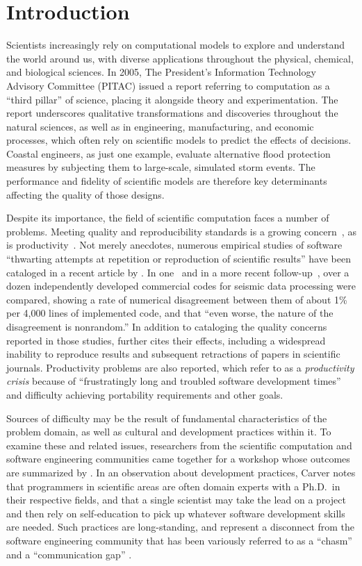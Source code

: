\documentclass[11pt]{article}
\begin{document}
\section{Introduction}

Scientists increasingly rely on computational models to explore and
understand the world around us, with diverse applications throughout
the physical, chemical, and biological sciences.  In 2005, The
President's Information Technology Advisory Committee (PITAC) issued a
report referring to computation as a ``third pillar'' of science,
placing it alongside theory and experimentation.  The report
underscores qualitative transformations and discoveries throughout the
natural sciences, as well as in engineering, manufacturing, and
economic processes, which often rely on scientific models to predict
the effects of decisions.  Coastal engineers, as just one example,
evaluate alternative flood protection measures by subjecting them to
large-scale, simulated storm events.  The performance and fidelity of
scientific models are therefore key determinants affecting the quality
of those designs.

Despite its importance, the field of scientific computation faces a
number of problems.  Meeting quality and reproducibility standards is
a growing concern~\citep{wilson2006}, as is
productivity~\citep{faulk2009}.  Not merely anecdotes, numerous
empirical studies of software ``thwarting attempts at repetition or
reproduction of scientific results'' have been cataloged in a recent
article by \cite{storer2017}.  In one~\citep{hatton1994} and in a more
recent follow-up~\citep{hatton2007}, over a dozen independently
developed commercial codes for seismic data processing were compared,
showing a rate of numerical disagreement between them of about 1\% per
4,000 lines of implemented code, and that ``even worse, the nature of
the disagreement is nonrandom.''  In addition to cataloging the
quality concerns reported in those studies, \cite{storer2017} further
cites their effects, including a widespread inability to reproduce
results and subsequent retractions of papers in scientific journals.
Productivity problems are also reported, which \cite{faulk2009} refer
to as a \emph{productivity crisis} because of ``frustratingly long and
troubled software development times'' and difficulty achieving
portability requirements and other goals.

Sources of difficulty may be the result of fundamental characteristics
of the problem domain, as well as cultural and development practices
within it.  To examine these and related issues, researchers from the
scientific computation and software engineering communities came
together for a workshop whose outcomes are summarized by
\cite{carver2009}.  In an observation about development practices,
Carver notes that programmers in scientific areas are often domain
experts with a Ph.D.\ in their respective fields, and that a single
scientist may take the lead on a project and then rely on
self-education to pick up whatever software development skills are
needed.  Such practices are long-standing, and represent a disconnect
from the software engineering community that has been variously
referred to as a ``chasm'' \citep{kelly2007,sanders2008} and a
``communication gap'' \citep{faulk2009}.
\end{document}
